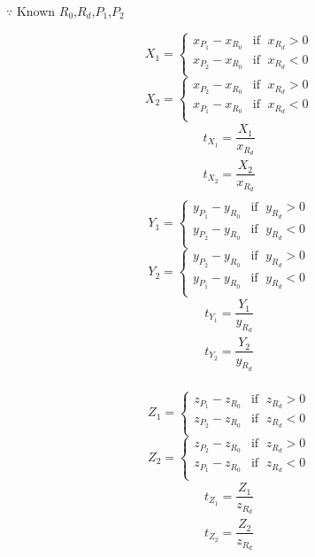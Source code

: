 $\because$ Known $R_0$,\enspace$R_d$,\enspace$P_1$,\enspace$P_2$
\begin{multicols}{2}
\noindent
\[
X_1 =
\begin{cases}
x_{P_1} - x_{R_0} & \text{if }\;x_{R_d} > 0\\
x_{P_2} - x_{R_0} & \text{if }\;x_{R_d} < 0\\
\end{cases}
\]
\[
X_2 =
\begin{cases}
x_{P_2} - x_{R_0} & \text{if }\;x_{R_d} > 0\\
x_{P_1} - x_{R_0} & \text{if }\;x_{R_d} < 0\\
\end{cases}
\]
\[
\begin{array}{lr}
t_{X_1} = \dfrac{X_1}{x_{R_d}}\\
t_{X_2} = \dfrac{X_2}{x_{R_d}}\\
\end{array}
\]
\columnbreak
\[
Y_1 =
\begin{cases}
y_{P_1} - y_{R_0} & \text{if }\;y_{R_d} > 0\\
y_{P_2} - y_{R_0} & \text{if }\;y_{R_d} < 0\\
\end{cases}
\]
\[
Y_2 =
\begin{cases}
y_{P_2} - y_{R_0} & \text{if }\;y_{R_d} > 0\\
y_{P_1} - y_{R_0} & \text{if }\;y_{R_d} < 0\\
\end{cases}
\]
\[
\begin{array}{lr}
t_{Y_1} = \dfrac{Y_1}{y_{R_d}}\\
t_{Y_2} = \dfrac{Y_2}{y_{R_d}}\\
\end{array}
\]
\end{multicols}
\begin{multicols}{2}
\noindent
\[
Z_1 =
\begin{cases}
z_{P_1} - z_{R_0} & \text{if }\;z_{R_d} > 0\\
z_{P_2} - z_{R_0} & \text{if }\;z_{R_d} < 0\\
\end{cases}
\]
\[
Z_2 =
\begin{cases}
z_{P_2} - z_{R_0} & \text{if }\;z_{R_d} > 0\\
z_{P_1} - z_{R_0} & \text{if }\;z_{R_d} < 0\\
\end{cases}
\]
\[
\begin{array}{lr}
t_{Z_1} = \dfrac{Z_1}{z_{R_d}}\\
t_{Z_2} = \dfrac{Z_2}{z_{R_d}}\\
\end{array}
\]
\columnbreak
\[
\]
\end{multicols}

